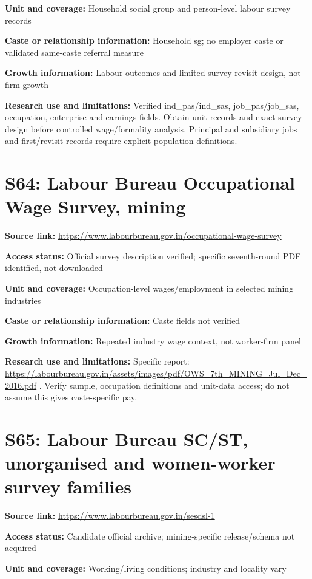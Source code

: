 \documentclass[11pt,a4paper]{report}
\begin{document}
\textbf{Unit and coverage:} Household social group and person-level labour survey records

\textbf{Caste or relationship information:} Household sg; no employer caste or validated same-caste referral measure

\textbf{Growth information:} Labour outcomes and limited survey revisit design, not firm growth

\textbf{Research use and limitations:} Verified ind\_pas/\allowbreak{}ind\_sas, job\_pas/\allowbreak{}job\_sas, occupation, enterprise and earnings fields. Obtain unit records and exact survey design before controlled wage/\allowbreak{}formality analysis. Principal and subsidiary jobs and first/\allowbreak{}revisit records require explicit population definitions.

\section{S64: Labour Bureau Occupational Wage Survey, mining}\hypertarget{S64}{}
\textbf{Source link:} \url{https://www.labourbureau.gov.in/occupational-wage-survey}

\textbf{Access status:} Official survey description verified; specific seventh-round PDF identified, not downloaded

\textbf{Unit and coverage:} Occupation-level wages/\allowbreak{}employment in selected mining industries

\textbf{Caste or relationship information:} Caste fields not verified

\textbf{Growth information:} Repeated industry wage context, not worker-firm panel

\textbf{Research use and limitations:} Specific report: \url{https://labourbureau.gov.in/assets/images/pdf/OWS_7th_MINING_Jul_Dec_2016.pdf} . Verify sample, occupation definitions and unit-data access; do not assume this gives caste-specific pay.

\section{S65: Labour Bureau SC/\allowbreak{}ST, unorganised and women-worker survey families}\hypertarget{S65}{}
\textbf{Source link:} \url{https://www.labourbureau.gov.in/sesdsl-1}

\textbf{Access status:} Candidate official archive; mining-specific release/\allowbreak{}schema not acquired

\textbf{Unit and coverage:} Working/\allowbreak{}living conditions; industry and locality vary
\end{document}
